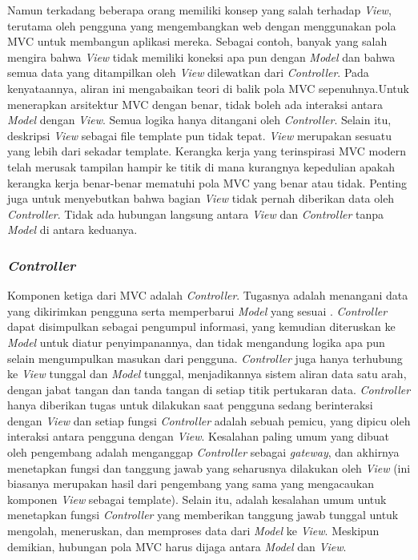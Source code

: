Namun terkadang beberapa orang memiliki konsep yang salah terhadap \textit{View}, terutama oleh pengguna yang mengembangkan web dengan menggunakan pola MVC untuk membangun aplikasi mereka. Sebagai contoh, banyak yang salah mengira bahwa \textit{View} tidak memiliki koneksi apa pun dengan \textit{Model} dan bahwa semua data yang ditampilkan oleh \textit{View} dilewatkan dari \textit{Controller}. Pada kenyataannya, aliran ini mengabaikan teori di balik pola MVC sepenuhnya.Untuk menerapkan arsitektur MVC dengan benar, tidak boleh ada interaksi antara \textit{Model} dengan \textit{View}. Semua logika hanya ditangani oleh \textit{Controller}. Selain itu, deskripsi \textit{View} sebagai file template pun tidak tepat. \textit{View} merupakan sesuatu yang lebih dari sekadar template. Kerangka kerja yang terinspirasi MVC modern telah merusak tampilan hampir ke titik di mana kurangnya  kepedulian apakah kerangka kerja benar-benar mematuhi pola MVC yang benar atau tidak. Penting juga untuk menyebutkan bahwa bagian \textit{View} tidak pernah diberikan data oleh \textit{Controller}. Tidak ada hubungan langsung antara \textit{View} dan \textit{Controller} tanpa \textit{Model} di antara keduanya.  

\subsubsection{\textit{Controller}}
\label{sec:Controller} 
Komponen ketiga dari MVC adalah \textit{Controller}. Tugasnya adalah menangani data yang dikirimkan pengguna serta memperbarui \textit{Model} yang sesuai \cite{codeigniter}. \textit{Controller} dapat disimpulkan sebagai pengumpul informasi, yang kemudian diteruskan ke \textit{Model} untuk diatur penyimpanannya, dan tidak mengandung logika apa pun selain mengumpulkan masukan dari pengguna. \textit{Controller} juga hanya terhubung ke \textit{View} tunggal dan \textit{Model} tunggal, menjadikannya sistem aliran data satu arah, dengan jabat tangan dan tanda tangan di setiap titik pertukaran data. \textit{Controller} hanya diberikan tugas untuk dilakukan saat pengguna sedang berinteraksi dengan \textit{View} dan setiap fungsi \textit{Controller} adalah sebuah pemicu, yang dipicu oleh interaksi antara pengguna dengan \textit{View}. Kesalahan paling umum yang dibuat oleh pengembang adalah menganggap \textit{Controller} sebagai \textit{gateway}, dan akhirnya menetapkan fungsi dan tanggung jawab yang seharusnya dilakukan oleh \textit{View} (ini biasanya merupakan hasil dari pengembang yang sama yang mengacaukan komponen \textit{View} sebagai template). Selain itu, adalah kesalahan umum untuk menetapkan fungsi \textit{Controller} yang memberikan tanggung jawab tunggal untuk mengolah, meneruskan, dan memproses data dari \textit{Model} ke \textit{View}. Meskipun demikian, hubungan pola MVC harus dijaga antara \textit{Model} dan \textit{View}. 

